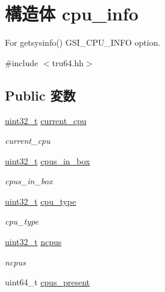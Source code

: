 \hypertarget{structTru64_1_1cpu__info}{
\section{構造体 cpu\_\-info}
\label{structTru64_1_1cpu__info}
}


For getsysinfo() GSI\_\-CPU\_\-INFO option.  


{\ttfamily \#include $<$tru64.hh$>$}\subsection*{Public 変数}
\begin{DoxyCompactItemize}
\item 
\hyperlink{Type_8hh_a435d1572bf3f880d55459d9805097f62}{uint32\_\-t} \hyperlink{structTru64_1_1cpu__info_a515699dbb122f4a0aa217ad2038731f6}{current\_\-cpu}
\begin{DoxyCompactList}\small\item\em current\_\-cpu \item\end{DoxyCompactList}\item 
\hyperlink{Type_8hh_a435d1572bf3f880d55459d9805097f62}{uint32\_\-t} \hyperlink{structTru64_1_1cpu__info_ae4e140571dc31f461adcff810fd04f53}{cpus\_\-in\_\-box}
\begin{DoxyCompactList}\small\item\em cpus\_\-in\_\-box \item\end{DoxyCompactList}\item 
\hyperlink{Type_8hh_a435d1572bf3f880d55459d9805097f62}{uint32\_\-t} \hyperlink{structTru64_1_1cpu__info_ac6304017c7a42fa42cee906c65b9aec6}{cpu\_\-type}
\begin{DoxyCompactList}\small\item\em cpu\_\-type \item\end{DoxyCompactList}\item 
\hyperlink{Type_8hh_a435d1572bf3f880d55459d9805097f62}{uint32\_\-t} \hyperlink{structTru64_1_1cpu__info_a6748c01687174bb54946596a156269ba}{ncpus}
\begin{DoxyCompactList}\small\item\em ncpus \item\end{DoxyCompactList}\item 
uint64\_\-t \hyperlink{structTru64_1_1cpu__info_afae844ab0f3d2ceabc4643394049ad33}{cpus\_\-present}

\end{DoxyCompactItemize}
